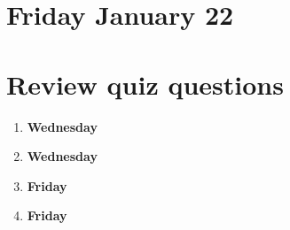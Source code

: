\documentclass[12pt, oneside]{article}
\begin{document}













\newpage
\section*{Friday January 22}







\newpage



\section*{Review quiz questions}
\begin{enumerate}
\item {\bf Wednesday}




\item {\bf Wednesday} 

\newpage
\item {\bf Friday} 


\item {\bf Friday} 



\end{enumerate}
\end{document}
